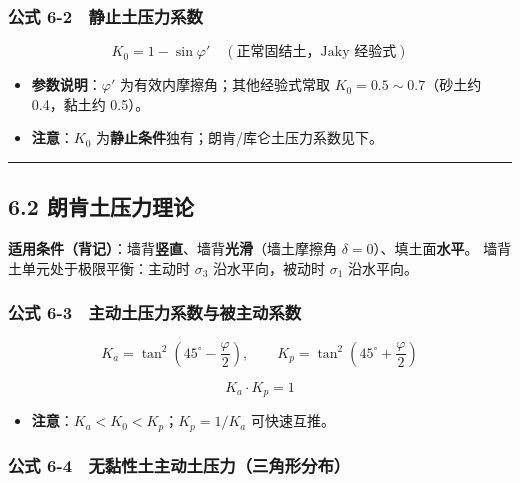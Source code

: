 \documentclass[
]{article}
\providecommand{\tightlist}{%
  \setlength{\itemsep}{0pt}\setlength{\parskip}{0pt}}
\begin{document}
\subsubsection{公式
6-2　静止土压力系数}\label{ux516cux5f0f-6-2-ux9759ux6b62ux571fux538bux529bux7cfbux6570}

\[K_0=1-\sin\varphi'\quad(\text{正常固结土，Jaky 经验式})\]

\begin{itemize}
\tightlist
\item
  \textbf{参数说明}：\(\varphi'\) 为有效内摩擦角；其他经验式常取
  \(K_0=0.5\sim0.7\)（砂土约 0.4，黏土约 0.5）。
\item
  \textbf{注意}：\(K_0\)
  为\textbf{静止条件}独有；朗肯/库仑土压力系数见下。
\end{itemize}

\begin{center}\rule{0.5\linewidth}{0.5pt}\end{center}

\subsection{6.2
朗肯土压力理论}\label{ux6717ux80afux571fux538bux529bux7406ux8bba}

\textbf{适用条件（背记）}：墙背\textbf{竖直}、墙背\textbf{光滑}（墙土摩擦角
\(\delta=0\)）、填土面\textbf{水平}。 墙背土单元处于极限平衡：主动时
\(\sigma_3\) 沿水平向，被动时 \(\sigma_1\) 沿水平向。

\subsubsection{公式
6-3　主动土压力系数与被主动系数}\label{ux516cux5f0f-6-3-ux4e3bux52a8ux571fux538bux529bux7cfbux6570ux4e0eux88abux4e3bux52a8ux7cfbux6570}

\[K_a=\tan^2\left(45^{\circ}-\frac{\varphi}{2}\right),\qquad K_p=\tan^2\left(45^{\circ}+\frac{\varphi}{2}\right)\]

\[K_a\cdot K_p=1\]

\begin{itemize}
\tightlist
\item
  \textbf{注意}：\(K_a<K_0<K_p\)；\(K_p=1/K_a\) 可快速互推。
\end{itemize}

\subsubsection{公式
6-4　无黏性土主动土压力（三角形分布）}\label{ux516cux5f0f-6-4-ux65e0ux9ecfux6027ux571fux4e3bux52a8ux571fux538bux529bux4e09ux89d2ux5f62ux5206ux5e03}
\end{document}
